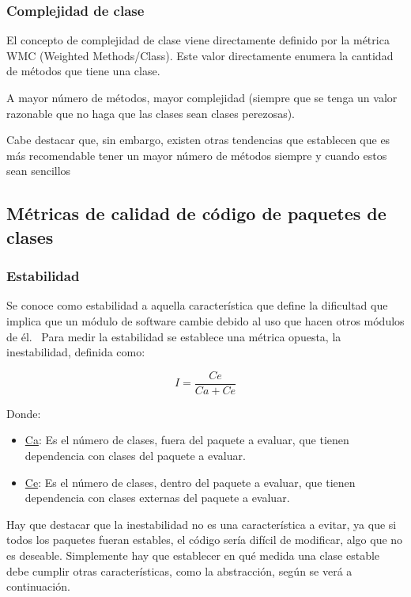 \documentclass[11pt]{article}
\begin{document}
\subsubsection{Complejidad de clase}

El concepto de complejidad de clase viene directamente definido por la métrica WMC (Weighted Methods/Class). Este valor directamente enumera la cantidad de métodos que tiene una clase. 

A mayor número de métodos, mayor complejidad (siempre que se tenga un valor razonable que no haga que las clases sean clases perezosas).

Cabe destacar que, sin embargo, existen otras tendencias que establecen que es más recomendable tener un mayor número de métodos siempre y cuando estos sean sencillos~\cite{refactoring:improvingdesign}

\subsection{Métricas de calidad de código de paquetes de clases}

\subsubsection{Estabilidad}
Se conoce como estabilidad a aquella característica que define la dificultad que implica que un módulo de software cambie debido al uso que hacen otros módulos de él.~\cite{unclebob:stabilityandabstraction}
Para medir la estabilidad se establece una métrica opuesta, la inestabilidad, definida como:

\begin{equation}
I = \frac{Ce}{Ca + Ce}
\end{equation}

Donde:
\begin{itemize}
\item{\underline{Ca}}: Es el número de clases, fuera del paquete a evaluar, que tienen dependencia con clases del paquete a evaluar.
\item{\underline{Ce}}: Es el número de clases, dentro del paquete a evaluar, que tienen dependencia con clases externas del paquete a evaluar.
\end{itemize}

Hay que destacar que la inestabilidad no es una característica a evitar, ya que si todos los paquetes fueran estables, el código sería difícil de modificar, algo que no es deseable. Simplemente hay que establecer en qué medida una clase estable debe cumplir otras características, como la abstracción, según se verá a continuación.
\end{document}
